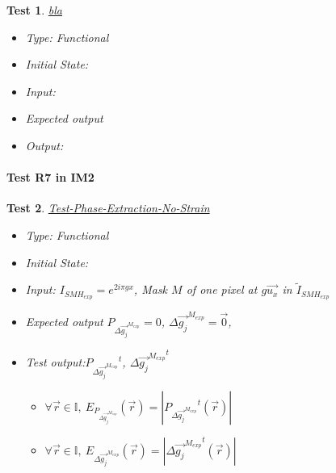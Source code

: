 \documentclass[12pt, titlepage]{article}
\newtheorem{Test}{Test}
\begin{document}
\begin{Test}\normalfont\underline{bla}
\begin{itemize}
\item Type: Functional
\item Initial State:
\item Input: 
\item Expected output
\item Output:  
\end{itemize}
\end{Test}
		
\paragraph{Test R7 in IM2}

\begin{Test}\normalfont\underline{Test-Phase-Extraction-No-Strain}
\begin{itemize}
\item Type: Functional
\item Initial State: 
\item Input: $I_{SMH_{exp}}=e^{2i\pi gx}$, Mask $M$ of one pixel at $g\overrightarrow{u_x}$ in $\widetilde{I}_{SMH_{exp}}$
\item Expected output $P_{\Delta \overrightarrow{g_{j}}^{M_{exp}}}=0$, $\Delta \overrightarrow{g_{j}}^{M_{exp}}=\overrightarrow{0}$, 
\item Test output:${P_{\Delta \overrightarrow{g_{j}}^{M_{exp}}}}^{t}$, $\Delta {\overrightarrow{g_{j}}^{M_{exp}}}^{t}$
	\begin{itemize}
	\item $\forall \vec{r} \in \mathbb{I}, \ E_{P_{\Delta \overrightarrow{g_{j}}^{M_{exp}}}}(\vec{r})=|{P_{\Delta \overrightarrow{g_{j}}^{M_{exp}}}}^{t}(\vec{r})|$
	\item $\forall \vec{r} \in \mathbb{I}, \ E_{\Delta {\overrightarrow{g_{j}}^{M_{exp}}}}(\vec{r})=|{\Delta {\overrightarrow{g_{j}}^{M_{exp}}}}^t(\vec{r})|$
	\end{itemize}  
\end{itemize}
\end{Test}
\end{document}

